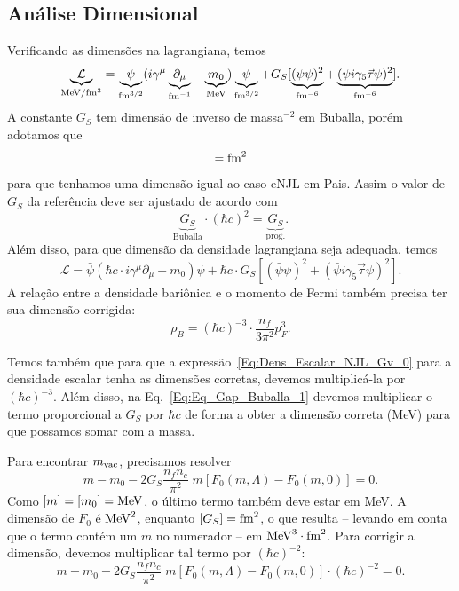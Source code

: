 \subsection{Análise Dimensional}

Verificando as dimensões na lagrangiana, temos
\begin{equation}
	\underbrace{\mathcal{L}}_{\mathcal{\rm{MeV}/\rm{fm}^3}} = \underbrace{\bar{\psi}}_{\rm{fm}^{3/2}}(i\gamma^\mu\underbrace{\partial_\mu}_{\rm{fm}^{-1}} - \underbrace{m_0}_{\rm{MeV}})\underbrace{\psi}_{\rm{fm}^{3/2}} + G_S [ \underbrace{(\bar{\psi}\psi)^2}_{\rm{fm}^{-6}} + \underbrace{(\bar{\psi}i\gamma_5\vec{\tau}\psi)^2}_{\rm{fm}^{-6}}].
\end{equation}
%
A constante $G_S$ tem dimensão de inverso de massa$^{-2}$ em Buballa\cite{Buballa1996}, porém adotamos que 
\begin{equation}
	[G_S] = \rm{fm}^{2}
\end{equation}
%
para que tenhamos uma dimensão igual ao caso eNJL em Pais\cite{Pais}. Assim o valor de $G_S$ da referência deve ser ajustado de acordo com
\begin{equation}
	\underbrace{G_S}_{\textrm{Buballa}} \cdot (\hbar c)^2 = \underbrace{G_S}_{\textrm{prog.}}.
\end{equation}
%
Além disso, para que dimensão da densidade lagrangiana seja adequada, temos
\begin{equation}
	\mathcal{L} = \bar{\psi}(\hbar c \cdot i\gamma^\mu\partial_\mu - m_0)\psi + \hbar c \cdot G_S[(\bar{\psi}\psi)^2 + (\bar{\psi}i\gamma_5\vec{\tau}\psi)^2].
\end{equation}
%
A relação entre a densidade bariônica e o momento de Fermi também precisa ter sua dimensão corrigida:
\begin{equation}
	\rho_B = (\hbar c)^{-3} \cdot \frac{n_f}{3\pi^2}p_F^3.
\end{equation}

Temos também que para que a expressão~\eqref{Eq:Dens_Escalar_NJL_Gv_0} para a densidade escalar tenha as dimensões corretas, devemos multiplicá-la por $(\hbar c)^{-3}$. Além disso, na Eq.~\eqref{Eq:Eq_Gap_Buballa_1} devemos multiplicar o termo proporcional a $G_S$ por $\hbar c$ de forma a obter a dimensão correta (MeV) para que possamos somar com a massa.

Para encontrar $m_{\rm{vac}}$, precisamos resolver
\begin{equation}
	m - m_0 - 2G_S\frac{n_f n_c}{\pi^2} \;m [F_0(m, \Lambda) - F_0(m,0)] = 0.
\end{equation}
%
Como $[m] = [m_0] = \rm{MeV}$, o último termo também deve estar em MeV. A dimensão de $F_0$ é $\rm{MeV}^2$, enquanto $[G_S] = \rm{fm}^2$, o que resulta -- levando em conta que o termo contém um $m$ no numerador -- em $\rm{MeV}^3\cdot\rm{fm}^2$. Para corrigir a dimensão, devemos multiplicar tal termo por $(\hbar c)^{-2}$:
\begin{equation}
	m - m_0 - 2G_S\frac{n_f n_c}{\pi^2} \;m [F_0(m, \Lambda) - F_0(m,0)] \cdot (\hbar c)^{-2} = 0.
\end{equation}

